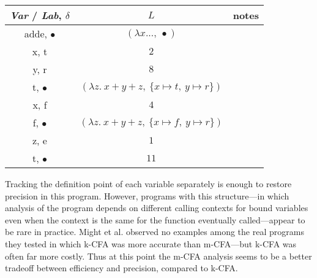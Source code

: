 \documentclass[11pt]{article}
\begin{document}
\tablespace
\begin{tabular}{c | c | l}

\textit{Var} / \textit{Lab}, $\delta$ & $L$ & notes \\
\hline
adde, $\bullet$ & $(\lambda x...,~ \bullet)$ \\
x, t            & $2$ \\
y, r            & $8$ \\
t, $\bullet$    & $(\lambda z .~ x + y + z,~\{x \mapsto t,~ y \mapsto r\})$ \\
x, f            & $4$ \\
f, $\bullet$    & $(\lambda z .~ x + y + z,~\{x \mapsto f,~ y \mapsto r\})$ \\
z, e            & $1$ \\
t, $\bullet$    & $11$ \\

\end{tabular}
\tablespace

Tracking the definition point of each variable separately is enough to restore precision in this program.  However, programs with this structure---in which analysis of the program depends on different calling contexts for bound variables even when the context is the same for the function eventually called---appear to be rare in practice.  Might et al. observed no examples among the real programs they tested in which k-CFA was more accurate than m-CFA---but k-CFA was often far more costly.  Thus at this point the m-CFA analysis seems to be a better tradeoff between efficiency and precision, compared to k-CFA.
\end{document}
